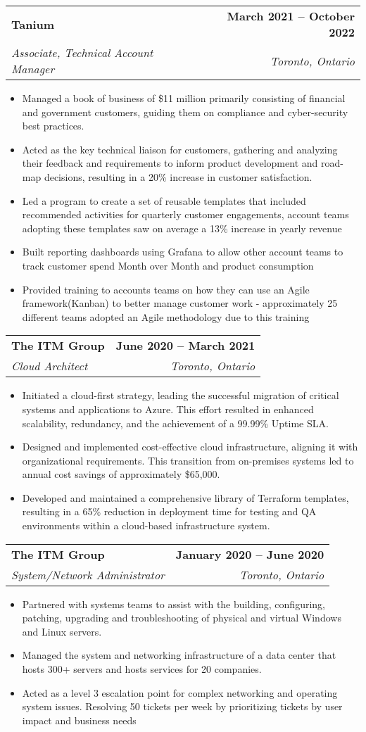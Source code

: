 \documentclass[letterpaper,11pt]{article}
\makeatletter
\newcommand{\resumeItem}[1]{
  \item\small{
    {#1 \vspace{-2pt}}
  }
}
\newcommand{\resumeSubheading}[4]{
  \vspace{-2pt}\item
    \begin{tabular*}{1.0\textwidth}[t]{l@{\extracolsep{\fill}}r}
      \textbf{#1} & \textbf{\small #2} \\
      \textit{\small#3} & \textit{\small #4} \\
    \end{tabular*}\vspace{-7pt}
}
\newcommand{\resumeItemListStart}{\begin{itemize}}
\newcommand{\resumeItemListEnd}{\end{itemize}\vspace{-5pt}}
\makeatother
\begin{document}
    \resumeSubheading
      {Tanium}{March 2021 -- October 2022}
      {Associate, Technical Account Manager}{Toronto, Ontario}
      \resumeItemListStart
        \resumeItem{Managed a book of business of \$11 million primarily consisting  of financial and government customers, guiding them on compliance and cyber-security best practices.}
        \resumeItem{Acted as the key technical liaison for customers, gathering and analyzing their feedback and requirements to inform product development and road-map decisions, resulting in a 20\% increase in customer satisfaction.}
        \resumeItem{Led a program to create a set of reusable templates that included recommended activities for quarterly customer engagements, account teams adopting these templates saw on average a 13\% increase in yearly revenue}
        \resumeItem{Built reporting  dashboards using Grafana to allow other account teams to track customer spend Month over Month and product consumption}
        \resumeItem{Provided training to accounts teams on how they can use an Agile framework(Kanban) to better manage customer work - approximately 25 different teams adopted an Agile methodology due to this training}
    \resumeItemListEnd

    \resumeSubheading
      {The ITM Group}{June 2020 -- March 2021}
      {Cloud Architect}{Toronto, Ontario}
      \resumeItemListStart
        \resumeItem{Initiated a cloud-first strategy, leading the successful migration of critical systems and applications to Azure. This effort resulted in enhanced scalability, redundancy, and the achievement of a 99.99\% Uptime SLA.}
        \resumeItem{Designed and implemented cost-effective cloud infrastructure, aligning it with organizational requirements. This transition from on-premises systems led to annual cost savings of approximately \$65,000.}
        \resumeItem{Developed and maintained a comprehensive library of Terraform templates, resulting in a 65\% reduction in deployment time for testing and QA environments within a cloud-based infrastructure system.}
    \resumeItemListEnd

    \resumeSubheading
      {The ITM Group}{January 2020 -- June 2020}
      {System/Network Administrator}{Toronto, Ontario}
       \resumeItemListStart
        \resumeItem{Partnered with systems teams to assist with the building, configuring, patching, upgrading and troubleshooting of physical and virtual Windows and Linux servers.}
        \resumeItem{Managed the system and networking infrastructure of a data center that hosts 300+ servers and hosts services for 20 companies.}
        \resumeItem{Acted as a level 3 escalation point for complex networking and operating system issues. Resolving 50 tickets per week by prioritizing tickets by user impact and business needs}
    \resumeItemListEnd
    
\end{document}
